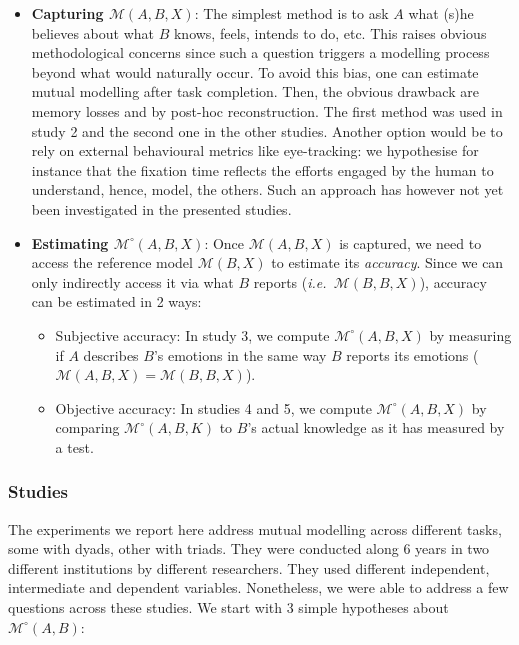 \documentclass[twocolumn]{article}
\newcommand{\ie}{{\textit{i.e.\ }}}
\newcommand{\M}[3]{{\mathcal{M}(#1, #2, #3)}}
\newcommand{\model}[3]{{$\mathcal{M}(#1, #2, #3)$}}
\newcommand{\refmodel}[2]{{$\mathcal{M}(#1, #2)$}}
\newcommand{\Model}[3]{{$\mathcal{M}^{\circ}(#1, #2, #3)$}}
\begin{document}
\begin{itemize}
    \item {\bf Capturing \model{A}{B}{X}}: The simplest method is to ask $A$ what (s)he
        believes about what $B$ knows, feels, intends to do, etc. This raises
        obvious methodological concerns since such a question triggers a
        modelling process beyond what would naturally occur. To avoid this
        bias, one can estimate mutual modelling after task completion. Then, the
        obvious drawback are memory losses and by post-hoc reconstruction.  The
        first method was used in study 2 and the second one in the other
        studies. Another option would be to rely on external behavioural metrics
        like eye-tracking: we hypothesise for instance that the fixation time
        reflects the efforts engaged by the human to understand, hence, model,
        the others. Such an approach has however not yet been investigated in
        the presented studies.

    \item {\bf Estimating \Model{A}{B}{X}}: Once \model{A}{B}{X} is captured, we
        need to access the reference model \refmodel{B}{X} to estimate its
        \emph{accuracy}. Since we can only indirectly access it via what $B$
        reports (\ie \model{B}{B}{X}), accuracy can be estimated in 2 ways:

        \begin{itemize}

            \item Subjective accuracy: In study 3, we compute
                \Model{A}{B}{X} by measuring if $A$ describes
                $B$'s emotions in the same way $B$ reports its emotions 
                ($\M{A}{B}{X} = \M{B}{B}{X}$).

            \item Objective accuracy: In studies 4 and 5, we compute
                \Model{A}{B}{X} by comparing \Model{A}{B}{K} to $B$'s
                actual knowledge as it has measured by a test.

        \end{itemize}

\end{itemize}


\subsubsection*{Studies}

The experiments we report here address mutual modelling across different tasks,
some with dyads, other with triads. They were conducted along 6 years in two
different institutions by different researchers. They used different
independent, intermediate and dependent variables. Nonetheless, we were able to
address a few questions across these studies. We start with 3 simple hypotheses
about $\mathcal{M}^{\circ}(A,B)$:
\end{document}
